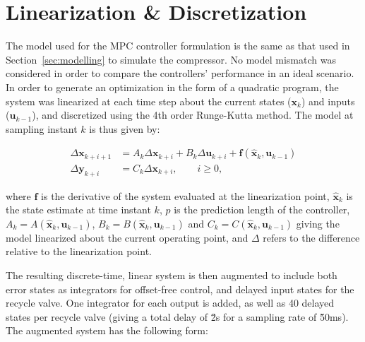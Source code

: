 \section{Linearization \& Discretization}

The model used for the MPC controller formulation is the same as that used in Section~\ref{sec:modelling} to simulate the compressor.
No model mismatch was considered in order to compare the controllers' performance in an ideal scenario.
In order to generate an optimization in the form of a quadratic program, the system was linearized at each time step about the current states ($\bm{x}_k$) and inputs ($\bm{u}_{k-1}$), and discretized using the 4th order Runge-Kutta method.
The model at sampling instant $k$ is thus given by:

\begin{equation}
  \begin{split}
    \Delta \bm{x}_{k+i+1} & = A_k\Delta \bm{x}_{k+i} + B_k\Delta \bm{u}_{k+i} + \bm{f}\left( \bm{\hat{x}}_{k}, \bm{u}_{k-1} \right)\\
    \Delta \bm{y}_{k+i} & = C_k\Delta \bm{x}_{k+i}, \qquad
    i \geq 0,
  \end{split}
\end{equation}

\noindent where $\bm{f}$ is the derivative of the system evaluated at the linearization point, $\bm{\hat{x}}_k$ is the state estimate at time instant $k$, $p$ is the prediction length of the controller, $A_k = A(\bm{\hat{x}}_k, \bm{u}_{k-1})$, $B_k = B(\bm{\hat{x}}_k, \bm{u}_{k-1})$ and $C_k = C(\bm{\hat{x}}_k, \bm{u}_{k-1})$ giving the model linearized about the current operating point, and $\Delta$ refers to the difference relative to the linearization point.

The resulting discrete-time, linear system is then augmented to include both error states as integrators for offset-free control, and delayed input states for the recycle valve.
One integrator for each output is added, as well as 40 delayed states per recycle valve (giving a total delay of \u{2}{s} for a sampling rate of \u{50}{ms}).
The augmented system has the following form:


